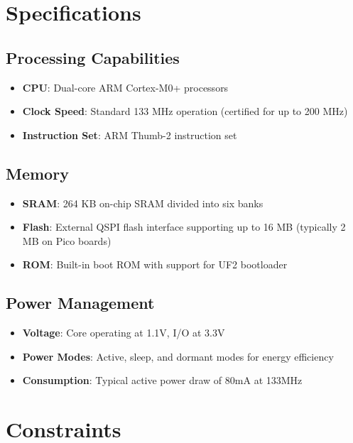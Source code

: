 \section{Specifications}

\subsection{Processing Capabilities}
\begin{itemize}
    \item \textbf{CPU}: Dual-core ARM Cortex-M0+ processors \cite{RaspberryPiRP2040:2024}
    \item \textbf{Clock Speed}: Standard 133 MHz operation (certified for up to 200 MHz) \cite{RaspberryPiRP2040:2024}
    \item \textbf{Instruction Set}: ARM Thumb-2 instruction set \cite{RaspberryPiRP2040:2024}
\end{itemize}

\subsection{Memory}
\begin{itemize}
    \item \textbf{SRAM}: 264 KB on-chip SRAM divided into six banks \cite{Schneider:2023}
    \item \textbf{Flash}: External QSPI flash interface supporting up to 16 MB (typically 2 MB on Pico boards) \cite{Schneider:2023}
    \item \textbf{ROM}: Built-in boot ROM with support for UF2 bootloader \cite{Schneider:2023}
\end{itemize}

\subsection{Power Management}
\begin{itemize}
    \item \textbf{Voltage}: Core operating at 1.1V, I/O at 3.3V \cite{RaspberryPiRP2040:2024}
    \item \textbf{Power Modes}: Active, sleep, and dormant modes for energy efficiency \cite{RaspberryPiRP2040:2024}
    \item \textbf{Consumption}: Typical active power draw of 80mA at 133MHz \cite{RaspberryPiRP2040:2024}
\end{itemize}

\section{Constraints}

